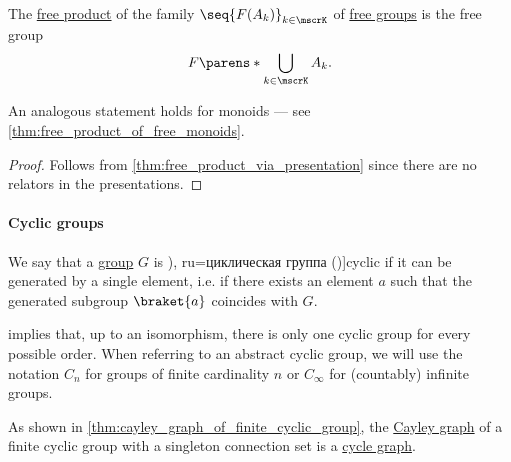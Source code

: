 \begin{corollary}\label{thm:free_product_of_free_groups}
  The \hyperref[def:monoid_free_product]{free product} of the family \( \seq{ F(A_k) }_{k \in \mscrK} \) of \hyperref[def:free_group]{free groups} is the free group
  \begin{equation*}
    F\parens*{ \bigcup_{k \in \mscrK} A_k }.
  \end{equation*}
\end{corollary}
\begin{comments}
  \item An analogous statement holds for monoids --- see \cref{thm:free_product_of_free_monoids}.
\end{comments}
\begin{proof}
  Follows from \cref{thm:free_product_via_presentation} since there are no relators in the presentations.
\end{proof}

\paragraph{Cyclic groups}

\begin{definition}\label{def:cyclic_group}
  We say that a \hyperref[def:group]{group} \( G \) is \term[ru=циклична группа (\cite[379]{Обрешков1962ВисшаАлгебра}), ru=циклическая группа (\cite[97]{Тыртышников2017ОсновыАлгебры})]{cyclic} if it can be generated by a single element, i.e. if there exists an element \( a \) such that the generated subgroup \( \braket{ a } \) coincides with \( G \).

   implies that, up to an isomorphism, there is only one cyclic group for every possible order. When referring to an abstract cyclic group, we will use the notation \( C_n \) for groups of finite cardinality \( n \) or \( C_\infty \) for (countably) infinite groups.
\end{definition}
\begin{comments}
  \item As shown in \cref{thm:cayley_graph_of_finite_cyclic_group}, the \hyperref[def:cayley_graph]{Cayley graph} of a finite cyclic group with a singleton connection set is a \hyperref[def:cycle_graph]{cycle graph}.
\end{comments}

